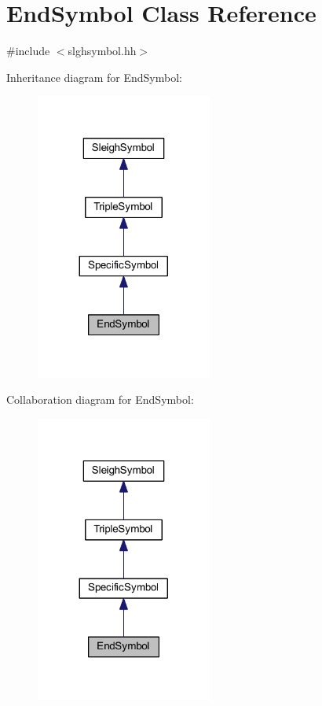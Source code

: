 \hypertarget{class_end_symbol}{}\section{End\+Symbol Class Reference}
\label{class_end_symbol}


{\ttfamily \#include $<$slghsymbol.\+hh$>$}



Inheritance diagram for End\+Symbol\+:
\nopagebreak
\begin{figure}[H]
\begin{center}
\leavevmode
\includegraphics[width=164pt]{class_end_symbol__inherit__graph}
\end{center}
\end{figure}


Collaboration diagram for End\+Symbol\+:
\nopagebreak
\begin{figure}[H]
\begin{center}
\leavevmode
\includegraphics[width=164pt]{class_end_symbol__coll__graph}
\end{center}
\end{figure}
